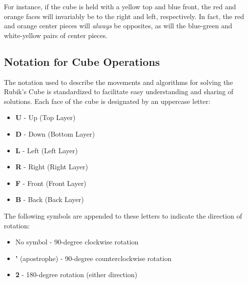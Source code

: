 \documentclass[12pt]{article}
\begin{document}
For instance, if the cube is held with a yellow top and blue front, the red and orange faces will invariably be to the right and left, respectively. In fact, the red and orange center pieces will \textit{always} be opposites, as will the blue-green and white-yellow pairs of center pieces.\\

\subsection{Notation for Cube Operations}

The notation used to describe the movements and algorithms for solving the Rubik's Cube is standardized to facilitate easy understanding and sharing of solutions. Each face of the cube is designated by an uppercase letter:

\begin{itemize}
    \item \textbf{U} - Up (Top Layer)
    \item \textbf{D} - Down (Bottom Layer)
    \item \textbf{L} - Left (Left Layer)
    \item \textbf{R} - Right (Right Layer)
    \item \textbf{F} - Front (Front Layer)
    \item \textbf{B} - Back (Back Layer)
\end{itemize}

The following symbols are appended to these letters to indicate the direction of rotation:

\begin{itemize}
    \item No symbol - 90-degree clockwise rotation
    \item \textbf{'} (apostrophe) - 90-degree counterclockwise rotation
    \item \textbf{2} - 180-degree rotation (either direction)
\end{itemize}

\vspace{0.5cm}
\end{document}
